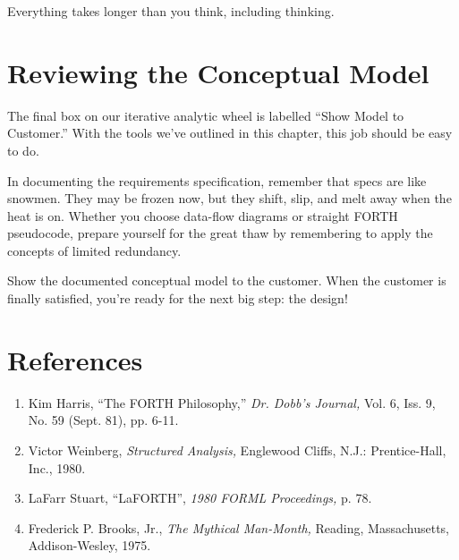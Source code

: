 \begin{tip}
Everything takes longer than you think, including thinking.
\end{tip}

\section{Reviewing the Conceptual Model}

The final box on our iterative analytic wheel is labelled ``Show Model
to Customer.'' With the tools we've outlined in this chapter, this job
should be easy to do.

In documenting the requirements specification, remember that specs are
like snowmen. They may be frozen now, but they shift, slip, and melt
away when the heat is on. Whether you choose data-flow diagrams or
straight FORTH pseudocode, prepare yourself for the great thaw by
remembering to apply the concepts of limited redundancy.

Show the documented conceptual model to the customer. When the
customer is finally satisfied, you're ready for the next big step: the
design!

\section{References}

\begin{enumerate}
\item Kim Harris, ``The FORTH Philosophy,''
  \emph{Dr. Dobb's Journal,}
  Vol. 6, Iss. 9, No. 59 (Sept. 81), pp. 6-11.
\item Victor Weinberg, \emph{Structured Analysis,}
   Englewood Cliffs, N.J.: Prentice-Hall, Inc., 1980.
\item LaFarr Stuart, ``LaFORTH'',
  \emph{1980 FORML Proceedings,} p. 78.
\item Frederick P. Brooks, Jr., \emph{The Mythical Man-Month,}
  Reading, Massachusetts, Addison-Wesley, 1975.
\end{enumerate}

